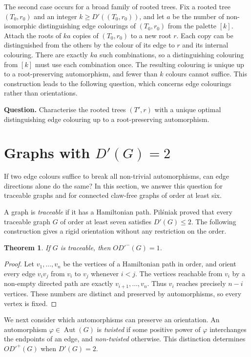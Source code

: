 \documentclass[a4paper,12pt]{elsarticle}
\newtheorem{theorem}{Theorem}
\newcommand{\Aut}{\ensuremath{\operatorname{Aut}}}
\begin{document}
The second case occurs for a broad family of rooted trees. Fix a rooted tree $(T_0,r_0)$ and an integer $k\geq D'((T_0,r_0))$, and let $a$ be the number of non-isomorphic distinguishing edge colourings of $(T_0,r_0)$ from the palette $[k]$. Attach the roots of $ka$ copies of $(T_0,r_0)$ to a new root $r$. Each copy can be distinguished from the others by the colour of its edge to $r$ and its internal colouring. There are exactly $ka$ such combinations, so a distinguishing colouring from $[k]$ must use each combination once. The resulting colouring is unique up to a root-preserving automorphism, and fewer than $k$ colours cannot suffice. This construction leads to the following question, which concerns edge colourings rather than orientations.

\textbf{Question.} Characterise the rooted trees $(T',r)$ with a unique optimal distinguishing edge colouring up to a root-preserving automorphism.

\section{Graphs with $D'(G)=2$} \label{sec:D'=2}

If two edge colours suffice to break all non-trivial automorphisms, can edge directions alone do the same? In this section, we answer this question for traceable graphs and for connected claw-free graphs of order at least six.

A graph is \emph{traceable} if it has a Hamiltonian path. Pil\'sniak \cite{Pilsniak_traceable} proved that every traceable graph $G$ of order at least seven satisfies $D'(G)\leq 2$. The following construction gives a rigid orientation without any restriction on the order.

\begin{theorem} \label{thm: traceable}
If $G$ is traceable, then $OD'^-(G)=1$.
\end{theorem}
\begin{proof}
Let $v_1,\ldots,v_n$ be the vertices of a Hamiltonian path in order, and orient every edge $v_iv_j$ from $v_i$ to $v_j$ whenever $i<j$. The vertices reachable from $v_i$ by a non-empty directed path are exactly $v_{i+1},\ldots,v_n$. Thus $v_i$ reaches precisely $n-i$ vertices. These numbers are distinct and preserved by automorphisms, so every vertex is fixed.
\end{proof}

We next consider which automorphisms can preserve an orientation. An automorphism $\varphi\in\Aut(G)$ is \emph{twisted} if some positive power of $\varphi$ interchanges the endpoints of an edge, and \emph{non-twisted} otherwise. This distinction determines $OD'^+(G)$ when $D'(G)=2$.
\end{document}

